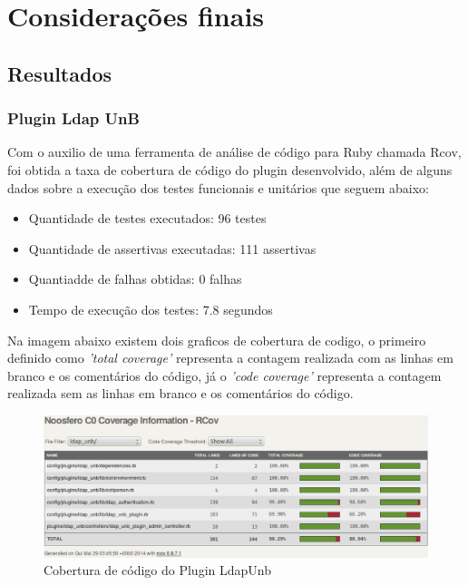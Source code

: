 \chapter{Considerações finais}
\label{consideracoes-finais}


\section{Resultados}
\label{results}

\subsection{Plugin Ldap UnB}

Com o auxilio de uma ferramenta de análise de código para Ruby chamada Rcov, foi obtida a taxa de cobertura de código do plugin desenvolvido, além de alguns dados sobre a execução dos testes funcionais e unitários que seguem abaixo:

\begin{itemize}
\item Quantidade de testes executados: 96 testes
\item Quantidade de assertivas executadas: 111 assertivas
\item Quantiadde de falhas obtidas: 0 falhas
\item Tempo de execução dos testes: 7.8 segundos
\end{itemize}
%
Na imagem abaixo existem dois graficos de cobertura de codigo, o primeiro definido como \textit{'total coverage'} representa a contagem realizada com as linhas em branco e os comentários do código, já o \textit{'code coverage'} representa a contagem realizada sem as linhas em branco e os comentários do código.
%
\begin{figure}[!h]
    \centering
    \includegraphics[keepaspectratio=false,scale=0.45]
      {figuras/cobertura_teste.eps}
    \caption{Cobertura de código do Plugin LdapUnb}
    \label{noosfero_bug}
\end{figure}
%

